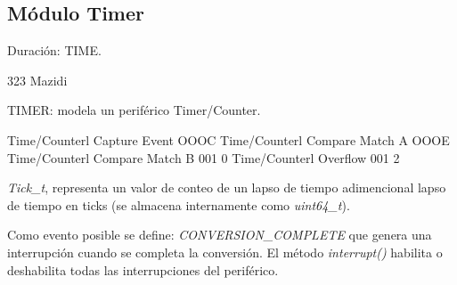 \subsection{Módulo Timer}
Duración: TIME.

323 Mazidi

TIMER: modela un periférico Timer/Counter.

Time/Counterl Capture Event OOOC
Time/Counterl Compare Match A OOOE
Time/Counterl Compare Match B 001 0
Time/Counterl Overflow 001 2


\emph{Tick\_t}, representa un valor de conteo de un lapso de tiempo adimencional lapso de tiempo en ticks (se almacena internamente como \emph{uint64\_t}).

Como evento posible se define: \emph{CONVERSION\_COMPLETE} que genera una interrupción cuando se completa la conversión. El método \emph{interrupt()} habilita  o deshabilita todas las interrupciones del periférico.





